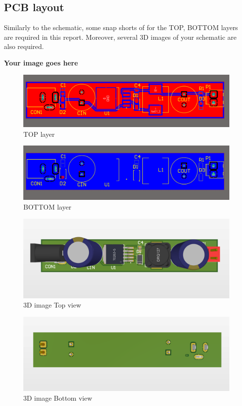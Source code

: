 \subsection{PCB layout}

Similarly to the schematic, some snap shorts of for the TOP, BOTTOM layers are required
in this report. Moreover, several 3D images of your schematic are also required.

\textbf{Your image goes here}

\begin{figure}[ht]
    \centering
    \includegraphics[scale=0.3]{graphics/ex2/f4.png}
    \caption{TOP layer}
\end{figure}

\begin{figure}[ht]
    \centering
    \includegraphics[scale=0.3]{graphics/ex2/f5.png}
    \caption{BOTTOM layer}
\end{figure}

\begin{figure}[ht]
    \centering
    \includegraphics[scale=0.3]{graphics/ex2/f2.png}
    \caption{3D image Top view}
\end{figure}

\begin{figure}[ht]
    \centering
    \includegraphics[scale=0.32]{graphics/ex2/f6.png}
    \caption{3D image Bottom view}
\end{figure}

